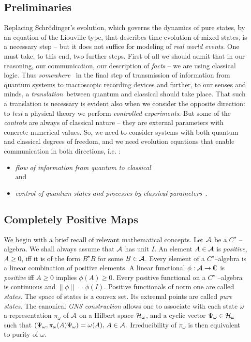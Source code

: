 \documentclass[12pt]{article}
\def\complex{{\kern .1em {\raise .47ex \hbox
{$\scriptscriptstyle
|$}}
\kern -.4em {\rm C}}}
\begin{document}
\subsection{Preliminaries}
Replacing Schr\"odinger's evolution, which governs the dynamics
of pure states, by an equation of the
Liouville type, that describes time evolution of mixed states,
is a necessary step -- but it does not suffice for modeling
of {\sl real world events}.  One must take,  to this end,  two further steps. 
First of all we should admit that in our reasoning,  our communication,  our
description of {\sl facts} -- we are using classical logic.  Thus {\sl somewhere }\
in the final step of transmission of information from quantum systems to
macroscopic recording devices and further, to our senses and minds,
a {\sl translation}\ between quantum and classical
 should
take place.  That such a translation is necessary is evident also when we
consider the opposite direction:  to {\sl test} a physical theory we perform 
{\sl controlled experiments}.  But some of the {\sl controls} are always of
classical nature -- they are external parameters with concrete numerical
values.  So,  we need to consider systems with both quantum and classical
degrees of freedom,  and we need evolution equations that enable communication 
in both directions,  i.e. :  \begin{itemize}
\item {\sl flow of information from quantum to classical} \\and \item 
{\sl control of quantum states and processes by
classical parameters}\ . 
\end{itemize}

\subsection{Completely Positive Maps}
We begin with a brief recall of relevant mathematical concepts.  
Let ${\cal A}$ be a $C^{\star}$ -- algebra.  We shall always assume that $
{\cal A}$ has unit $I$.  An element $A\in {\cal A}$ is {\sl positive},  $A\geq 0$, 
iff it is of the form $B^\star B$ for some $B\in {\cal A}$.  Every element of
a $C^{\star}$--algebra is a linear combination of positive elements.  A
linear functional $\phi :  {\cal A} \rightarrow \complex$ is {\sl positive} iff 
$A\geq 0$
implies $\phi  (A) \geq 0$.  Every positive functional on a $C^{\star}$
--algebra is continuous and $\| \phi\| = \phi  (I). $ Positive functionals of
norm one are called {\sl states}.  The space of states is a convex set.  Its
extremal points are called {\sl pure states}.  The canonical
 {\sl GNS construction}
allows one to associate with each state $\omega$ a representation $
\pi_\omega $ of ${\cal A}$ on a Hilbert space ${\cal H}_\omega$,  and a
cyclic vector $\Psi_\omega\in{\cal H}_\omega$ such that $ (\Psi_\omega
, \pi_\omega  (A)\Psi_\omega ) = \omega  (A) , \,  A\in {\cal A} . $
Irreducibility of $\pi_\omega$ is then equivalent to purity of $\omega . $
\end{document}

